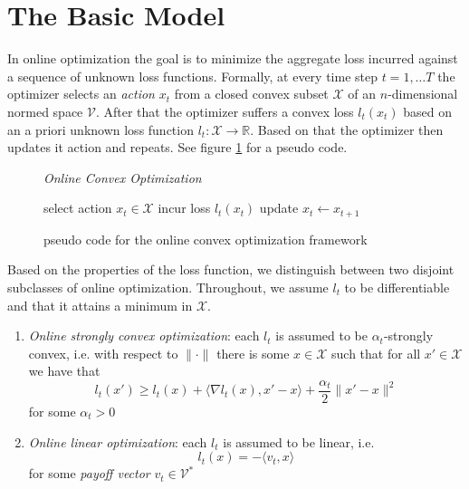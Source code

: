 \section{The Basic Model}\label{section:theBasicModel}

In online optimization the goal is to minimize the aggregate loss incurred against a sequence of unknown loss functions. Formally, at every time step $t = 1, \dots T$ the optimizer selects an \textit{action} $x_t$ from a closed convex subset $\mathcal{X}$ of an $n$-dimensional normed space $\mathcal{V}$. After that the optimizer suffers a convex loss $l_t(x_t)$ based on an a priori unknown loss function $l_t:\mathcal{X} \to \mathbb{R}$. Based on that the optimizer then updates it action and repeats. See figure \ref{fig:OCO} for a pseudo code.\\

\begin{figure}[H]\centering
    \textit{Online Convex Optimization}
    \begin{minipage}{.9\linewidth}
        \begin{algorithm}[H]
        \DontPrintSemicolon
         {
        select action $x_t \in \mathcal{X}$ \;
        incur loss $l_t(x_t)$ \;
        update $x_t \gets x_{t+1}$ \;
        }
        \end{algorithm}\caption{pseudo code for the online convex optimization framework}  \label{fig:OCO}
  \end{minipage}
\end{figure}

Based on the properties of the loss function, we distinguish between two disjoint subclasses of online optimization. Throughout, we assume $l_t$ to be differentiable and that it attains a minimum in $\mathcal{X}$.

\begin{enumerate}
    \item\label{item:stronglyOptimization} \textit{Online strongly convex optimization}: each $l_t$ is assumed to be $\alpha_t$-strongly convex, i.e. with respect to $\|\cdot\|$ there is some $x \in \mathcal{X}$ such that for all $x' \in \mathcal{X}$  we have that 
    \begin{equation}\label{equ:stronglyOptimization}
        l_t(x') \ge l_t(x) + \langle \nabla l_t(x),x'-x\rangle + \frac{\alpha_t}{2}\|x'-x\|^2
    \end{equation}
    for some $\alpha_t > 0$
    \item \textit{Online linear optimization}: each $l_t$ is assumed to be linear, i.e. 
    \begin{equation}\label{equ:linaerOptimization}
        l_t(x) = -\langle v_t,x\rangle
    \end{equation}
    for some \textit{payoff vector} $v_t \in \mathcal{V}^*$
\end{enumerate}

